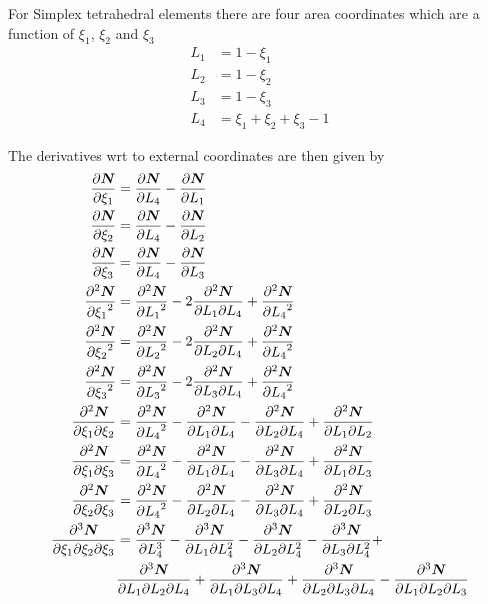 For Simplex tetrahedral elements there are four area coordinates which are a
function of $\xi_{1}$, $\xi_{2}$ and $\xi_{3}$ \ie
\begin{align}
  L_{1} &= 1 - \xi_{1} \\
  L_{2} &= 1 - \xi_{2} \\
  L_{3} &= 1 - \xi_{3} \\
  L_{4} &= \xi_{1} + \xi_{2} + \xi_{3} - 1
\end{align}

The derivatives wrt to external coordinates are then given by
\begin{align}
  \delby{\vect{\sbfnsymb{}}}{\xi_{1}} &= \delby{\vect{\sbfnsymb{}}}{L_{4}}-\delby{\vect{\sbfnsymb{}}}{L_{1}} \\
  \delby{\vect{\sbfnsymb{}}}{\xi_{2}} &= \delby{\vect{\sbfnsymb{}}}{L_{4}}-\delby{\vect{\sbfnsymb{}}}{L_{2}} \\
  \delby{\vect{\sbfnsymb{}}}{\xi_{3}} &= \delby{\vect{\sbfnsymb{}}}{L_{4}}-\delby{\vect{\sbfnsymb{}}}{L_{3}} \\
  \deltwosqby{\vect{\sbfnsymb{}}}{\xi_{1}} &= \deltwosqby{\vect{\sbfnsymb{}}}{L_{1}}-
  2\deltwoby{\vect{\sbfnsymb{}}}{L_{1}}{L_{4}}+\deltwosqby{\vect{\sbfnsymb{}}}{L_{4}} \\
  \deltwosqby{\vect{\sbfnsymb{}}}{\xi_{2}} &= \deltwosqby{\vect{\sbfnsymb{}}}{L_{2}}-
  2\deltwoby{\vect{\sbfnsymb{}}}{L_{2}}{L_{4}}+\deltwosqby{\vect{\sbfnsymb{}}}{L_{4}} \\
  \deltwosqby{\vect{\sbfnsymb{}}}{\xi_{3}} &= \deltwosqby{\vect{\sbfnsymb{}}}{L_{3}}-
  2\deltwoby{\vect{\sbfnsymb{}}}{L_{3}}{L_{4}}+\deltwosqby{\vect{\sbfnsymb{}}}{L_{4}} \\  
  \deltwoby{\vect{\sbfnsymb{}}}{\xi_{1}}{\xi_{2}} &= \deltwosqby{\vect{\sbfnsymb{}}}{L_{4}}-
  \deltwoby{\vect{\sbfnsymb{}}}{L_{1}}{L_{4}}-\deltwoby{\vect{\sbfnsymb{}}}{L_{2}}{L_{4}}+
  \deltwoby{\vect{\sbfnsymb{}}}{L_{1}}{L_{2}} \\
  \deltwoby{\vect{\sbfnsymb{}}}{\xi_{1}}{\xi_{3}} &= \deltwosqby{\vect{\sbfnsymb{}}}{L_{4}}-
  \deltwoby{\vect{\sbfnsymb{}}}{L_{1}}{L_{4}}-\deltwoby{\vect{\sbfnsymb{}}}{L_{3}}{L_{4}}+
  \deltwoby{\vect{\sbfnsymb{}}}{L_{1}}{L_{3}} \\
  \deltwoby{\vect{\sbfnsymb{}}}{\xi_{2}}{\xi_{3}} &= \deltwosqby{\vect{\sbfnsymb{}}}{L_{4}}-
  \deltwoby{\vect{\sbfnsymb{}}}{L_{2}}{L_{4}}-\deltwoby{\vect{\sbfnsymb{}}}{L_{3}}{L_{4}}+
  \deltwoby{\vect{\sbfnsymb{}}}{L_{2}}{L_{3}} \\
  \delthreeby{\vect{\sbfnsymb{}}}{\xi_{1}}{\xi_{2}}{\xi_{3}} &= \delthreecuby{\vect{\sbfnsymb{}}}{L_{4}}-
  \deldeltwoby{\vect{\sbfnsymb{}}}{L_{1}}{L_{4}}-\deldeltwoby{\vect{\sbfnsymb{}}}{L_{2}}{L_{4}}-
  \deldeltwoby{\vect{\sbfnsymb{}}}{L_{3}}{L_{4}}+ \\
  &\delthreeby{\vect{\sbfnsymb{}}}{L_{1}}{L_{2}}{L_{4}}+\delthreeby{\vect{\sbfnsymb{}}}{L_{1}}{L_{3}}{L_{4}}+
  \delthreeby{\vect{\sbfnsymb{}}}{L_{2}}{L_{3}}{L_{4}}-\delthreeby{\vect{\sbfnsymb{}}}{L_{1}}{L_{2}}{L_{3}}
\end{align}

